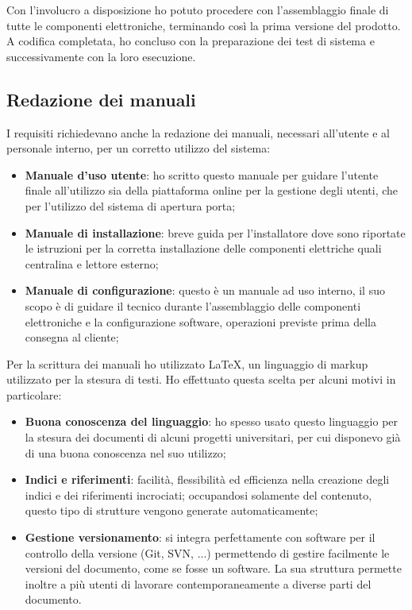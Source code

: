 Con l'involucro a disposizione ho potuto procedere con l'assemblaggio finale di tutte le componenti elettroniche, terminando così la prima versione del prodotto. A codifica completata, ho concluso con la preparazione dei test di sistema e successivamente con la loro esecuzione.

\subsection{Redazione dei manuali}
I requisiti richiedevano anche la redazione dei manuali, necessari all'utente e al personale interno, per un corretto utilizzo del sistema:
\begin{itemize}
\item \textbf{Manuale d'uso utente}: ho scritto questo manuale per guidare l'utente finale all'utilizzo sia della piattaforma online per la gestione degli utenti, che per l'utilizzo del sistema di apertura porta;
\item \textbf{Manuale di installazione}: breve guida per l'installatore dove sono riportate le istruzioni per la corretta installazione delle componenti elettriche quali centralina e lettore esterno;
\item \textbf{Manuale di configurazione}: questo è un manuale ad uso interno, il suo scopo è di guidare il tecnico durante l'assemblaggio delle componenti elettroniche e la configurazione software, operazioni previste prima della consegna al cliente;
\end{itemize}

Per la scrittura dei manuali ho utilizzato \LaTeX, un linguaggio di markup utilizzato per la stesura di testi.
Ho effettuato questa scelta per alcuni motivi in particolare:
\begin{itemize}
\item \textbf{Buona conoscenza del linguaggio}: ho spesso usato questo linguaggio per la stesura dei documenti di alcuni progetti universitari, per cui disponevo già di una buona conoscenza nel suo utilizzo;
\item \textbf{Indici e riferimenti}: facilità, flessibilità ed efficienza nella creazione degli indici e dei riferimenti incrociati; occupandosi solamente del contenuto, questo tipo di strutture vengono generate automaticamente;
\item \textbf{Gestione versionamento}: si integra perfettamente con software per il controllo della versione (Git, SVN, ...) permettendo di gestire facilmente le versioni del documento, come se fosse un software. La sua struttura permette inoltre a più utenti di lavorare contemporaneamente a diverse parti del documento.
\end{itemize}

